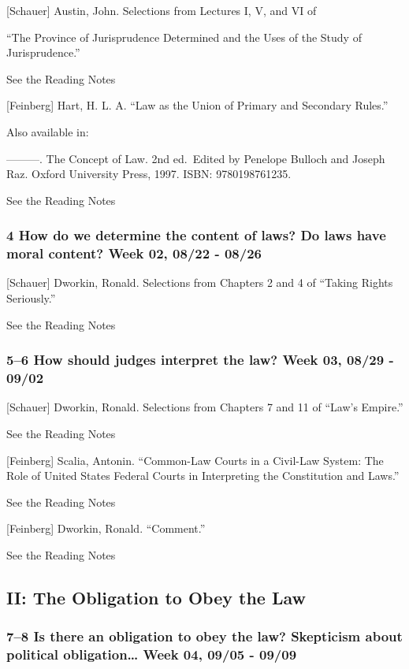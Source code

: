 \documentclass[11pt,]{article}
\begin{document}
{[}Schauer{]} Austin, John. Selections from Lectures I, V, and VI of

``The Province of Jurisprudence Determined and the Uses of the Study of
Jurisprudence.''

See the Reading Notes

{[}Feinberg{]} Hart, H. L. A. ``Law as the Union of Primary and
Secondary Rules.''

Also available in:

---------. The Concept of Law. 2nd ed.~Edited by Penelope Bulloch and
Joseph Raz. Oxford University Press, 1997. ISBN: 9780198761235.

See the Reading Notes

\subsubsection{4 How do we determine the content of laws? Do laws have
moral content? Week 02, 08/22 -
08/26}\label{how-do-we-determine-the-content-of-laws-do-laws-have-moral-content-week-02-0822---0826}

{[}Schauer{]} Dworkin, Ronald. Selections from Chapters 2 and 4 of
``Taking Rights Seriously.''

See the Reading Notes

\subsubsection{5--6 How should judges interpret the law? Week 03, 08/29
- 09/02}\label{how-should-judges-interpret-the-law-week-03-0829---0902}

{[}Schauer{]} Dworkin, Ronald. Selections from Chapters 7 and 11 of
``Law's Empire.''

See the Reading Notes

{[}Feinberg{]} Scalia, Antonin. ``Common-Law Courts in a Civil-Law
System: The Role of United States Federal Courts in Interpreting the
Constitution and Laws.''

See the Reading Notes

{[}Feinberg{]} Dworkin, Ronald. ``Comment.''

See the Reading Notes

\subsection{II: The Obligation to Obey the
Law}\label{ii-the-obligation-to-obey-the-law}

\subsubsection{7--8 Is there an obligation to obey the law? Skepticism
about political obligation\ldots{} Week 04, 09/05 -
09/09}\label{is-there-an-obligation-to-obey-the-law-skepticism-about-political-obligation-week-04-0905---0909}
\end{document}
